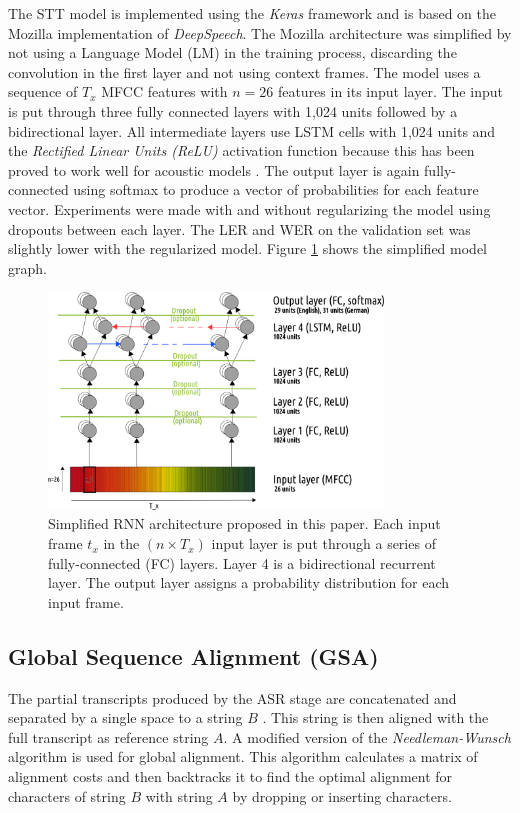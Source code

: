 \documentclass[letterpaper]{article}
\begin{document}
The STT model is implemented using the \textit{Keras} framework and is based on the Mozilla implementation of \textit{DeepSpeech}. The Mozilla architecture was simplified by not using a Language Model (LM) in the training process, discarding the convolution in the first layer and not using context frames. The model uses a sequence of $T_x$ MFCC features with $n=26$ features in its input layer. The input is put through three fully connected layers with 1,024 units followed by a bidirectional layer. All intermediate layers use LSTM cells with 1,024 units and the \textit{Rectified Linear Units (ReLU)} activation function because this has been proved to work well for acoustic models \parencite{relu}. The output layer is again fully-connected using softmax to produce a vector of probabilities for each feature vector. Experiments were made with and without regularizing the model using dropouts between each layer. The LER and WER on the validation set was slightly lower with the regularized model. Figure \ref{model_architecture} shows the simplified model graph.

\begin{figure}[!htb]
	\begin{center}
		\includegraphics[width=3.5in]{model_architecture.png}
		\caption{Simplified RNN architecture proposed in this paper. Each input frame $t_x$ in the $(n \times T_x)$ input layer is put through a series of fully-connected (FC) layers. Layer 4 is a bidirectional recurrent layer. The output layer assigns a probability distribution for each input frame.}
		\label{model_architecture}
	\end{center}
\end{figure}

\subsection{Global Sequence Alignment (GSA)}

The partial transcripts produced by the ASR stage are concatenated and separated by a single space to a string $B$ . This string is then aligned with the full transcript as reference string $A$. A modified version of the \textit{Needleman-Wunsch} algorithm is used for global alignment. This algorithm calculates a matrix of alignment costs and then backtracks it to find the optimal alignment for characters of string $B$ with string $A$ by dropping or inserting characters.
\end{document}
